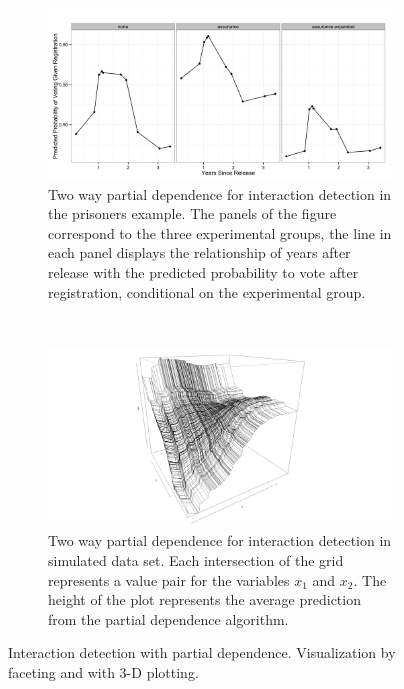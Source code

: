 \begin{figure}
        \centering
        \begin{subfigure}[b]{0.7\textwidth}
                \includegraphics[width=\textwidth]{figures/pd_int_cond_vote.png}
                \caption{Two way partial dependence for interaction detection in the prisoners example. The panels of the figure correspond to the three experimental groups, the line in each panel displays the relationship of years after release with the predicted probability to vote after registration, conditional on the experimental group. }
                \label{fig:int_prison}
        \end{subfigure}%
        ~ %

        \begin{subfigure}[b]{0.7\textwidth}
                \includegraphics[width=\textwidth]{figures/interaction.png}
                \caption{Two way partial dependence for interaction detection in simulated data set. Each intersection of the grid represents a value pair for the variables $x_1$ and $x_2$. The height of the plot represents the average prediction from the partial dependence algorithm.}
                \label{fig:int_3d}
        \end{subfigure}
        \caption{Interaction detection with partial dependence. Visualization by faceting and with 3-D plotting.}
        \label{fig:interaction}
\end{figure}
